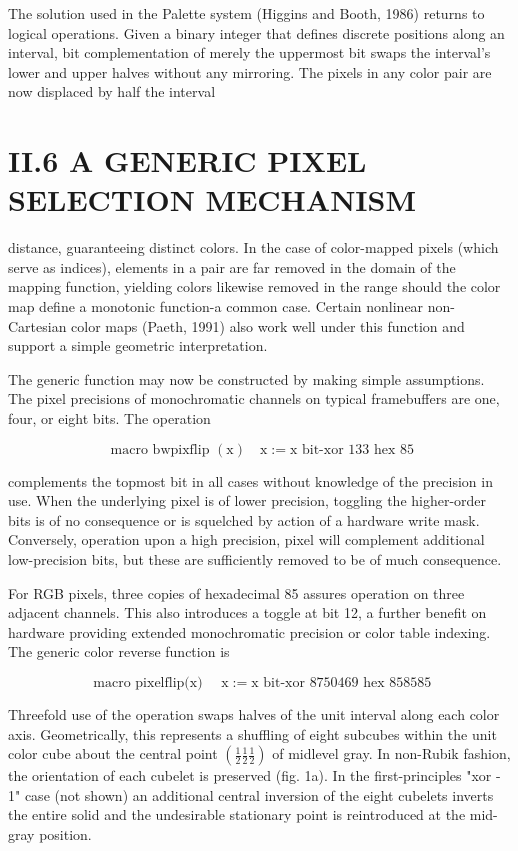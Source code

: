 \begin{CJK}{UTF8}{gbsn}
The solution used in the Palette system (Higgins and Booth, 1986) returns to logical operations. Given a binary integer that defines discrete positions along an interval, bit complementation of merely the uppermost bit swaps the interval's lower and upper halves without any mirroring. The pixels in any color pair are now displaced by half the interval

\section{II.6 A GENERIC PIXEL SELECTION MECHANISM}
distance, guaranteeing distinct colors. In the case of color-mapped pixels (which serve as indices), elements in a pair are far removed in the domain of the mapping function, yielding colors likewise removed in the range should the color map define a monotonic function-a common case. Certain nonlinear non-Cartesian color maps (Paeth, 1991) also work well under this function and support a simple geometric interpretation.

The generic function may now be constructed by making simple assumptions. The pixel precisions of monochromatic channels on typical framebuffers are one, four, or eight bits. The operation

$$
\text { macro bwpixflip }(\mathrm{x}) \quad \mathrm{x}:=\mathrm{x} \text { bit-xor } 133 \text { hex } 85
$$

complements the topmost bit in all cases without knowledge of the precision in use. When the underlying pixel is of lower precision, toggling the higher-order bits is of no consequence or is squelched by action of a hardware write mask. Conversely, operation upon a high precision, pixel will complement additional low-precision bits, but these are sufficiently removed to be of much consequence.

For RGB pixels, three copies of hexadecimal 85 assures operation on three adjacent channels. This also introduces a toggle at bit 12, a further benefit on hardware providing extended monochromatic precision or color table indexing. The generic color reverse function is

$$
\text { macro pixelflip(x) } \quad \mathrm{x}:=\mathrm{x} \text { bit-xor } 8750469 \text { hex } 858585
$$

Threefold use of the operation swaps halves of the unit interval along each color axis. Geometrically, this represents a shuffling of eight subcubes within the unit color cube about the central point $\left(\frac{1}{2} \frac{1}{2} \frac{1}{2}\right)$ of midlevel gray. In non-Rubik fashion, the orientation of each cubelet is preserved (fig. 1a). In the first-principles "xor - 1" case (not shown) an additional central inversion of the eight cubelets inverts the entire solid and the undesirable stationary point is reintroduced at the mid-gray position.


\end{CJK}
